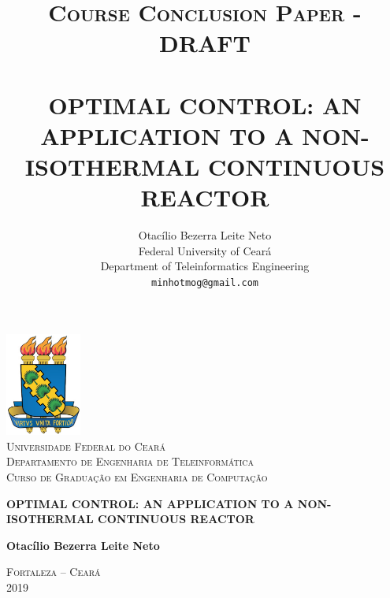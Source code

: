 \documentclass[a4paper,11pt]{book}
\title{ \normalsize \textsc{Course Conclusion Paper - DRAFT} 
        \\[2.0cm]             
        \HRule{0.5pt} \\              
        \LARGE \textbf{\uppercase{Optimal Control: An application to a non-isothermal continuous reactor}}
        \HRule{2pt} \\[0.5cm]  
}
\author{
        Otacílio Bezerra Leite Neto\\   
        Federal University of Ceará\\  
        Department of Teleinformatics Engineering\\
        \texttt{minhotmog@gmail.com} \\
}
\makeatletter
\numberwithin{figure}{chapter}
\numberwithin{equation}{chapter}
\numberwithin{table}{chapter}
\theoremstyle{definition}
\def\printtitle{
    {\centering \@title\par}}
\def\printauthor{
    {\centering \large \@author}}
\makeatother
\begin{document}
%


\thispagestyle{empty}
\begin{center}
    \includegraphics[width=2.5cm]{logo_ufc} \\%
    \textsc{
    Universidade Federal do Cear\'{a} \\%
    Departamento de Engenharia de Teleinform\'{a}tica \\%
    Curso de Gradua\c{c}\~{a}o em Engenharia de Computa\c{c}\~{a}o\\
    }

    \null\vfill%
    \vspace{.5cm}%
        {\LARGE         \textbf{\uppercase{Optimal Control: An application to a non-isothermal continuous reactor}}\\}

    \null\vfill%
    \vspace{.5cm}%

    {\normalsize    \textbf{Otacílio Bezerra Leite Neto}} \\%

    \null\vfill%
    \vspace{.25cm}%

    {\normalsize    \textsc{Fortaleza -- Cear\'{a} \\%
     2019}}
\end{center}
\end{document}
